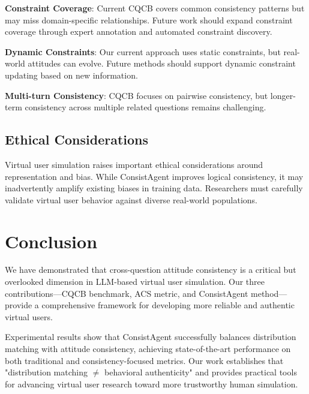 \documentclass[sigconf, anonymous]{acmart}
\begin{document}
\textbf{Constraint Coverage}: Current CQCB covers common consistency patterns but may miss domain-specific relationships. Future work should expand constraint coverage through expert annotation and automated constraint discovery.

\textbf{Dynamic Constraints}: Our current approach uses static constraints, but real-world attitudes can evolve. Future methods should support dynamic constraint updating based on new information.

\textbf{Multi-turn Consistency}: CQCB focuses on pairwise consistency, but longer-term consistency across multiple related questions remains challenging.

\subsection{Ethical Considerations}

Virtual user simulation raises important ethical considerations around representation and bias. While ConsistAgent improves logical consistency, it may inadvertently amplify existing biases in training data. Researchers must carefully validate virtual user behavior against diverse real-world populations.

\section{Conclusion}

We have demonstrated that cross-question attitude consistency is a critical but overlooked dimension in LLM-based virtual user simulation. Our three contributions—CQCB benchmark, ACS metric, and ConsistAgent method—provide a comprehensive framework for developing more reliable and authentic virtual users.

Experimental results show that ConsistAgent successfully balances distribution matching with attitude consistency, achieving state-of-the-art performance on both traditional and consistency-focused metrics. Our work establishes that "distribution matching $\neq$ behavioral authenticity" and provides practical tools for advancing virtual user research toward more trustworthy human simulation.



\end{document}
